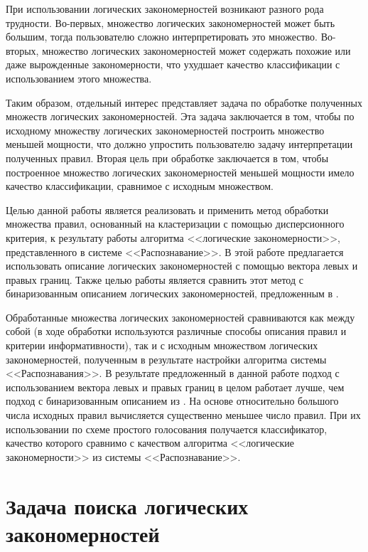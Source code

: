 \documentclass[12pt]{article}
\begin{document}
При использовании логических закономерностей возникают разного рода
трудности. Во-первых, множество логических закономерностей может быть
большим, тогда пользователю сложно интерпретировать это
множество. Во-вторых, множество логических закономерностей может
содержать похожие или даже вырожденные закономерности, что ухудшает
качество классификации с использованием этого множества.

Таким образом, отдельный интерес представляет задача по обработке
полученных множеств логических закономерностей. Эта задача заключается
в том, чтобы по исходному множеству логических закономерностей
построить множество меньшей мощности, что должно упростить
пользователю задачу интерпретации полученных правил. Вторая цель при
обработке заключается в том, чтобы построенное множество логических
закономерностей меньшей мощности имело качество классификации,
сравнимое с исходным множеством.

Целью данной работы является реализовать и применить метод обработки
множества правил, основанный на кластеризации с помощью дисперсионного
критерия, к результату работы алгоритма <<логические закономерности>>,
представленного в системе <<Распознавание>>. В этой работе
предлагается использовать описание логических закономерностей с
помощью вектора левых и правых границ. Также целью работы является
сравнить этот метод с бинаризованным описанием логических
закономерностей, предложенным в \cite{novikov15}.

Обработанные множества логических закономерностей сравниваются как
между собой (в ходе обработки используются различные способы описания
правил и критерии информативности), так и с исходным множеством
логических закономерностей, полученным в результате настройки
алгоритма системы <<Распознавания>>. В результате предложенный в
данной работе подход с использованием вектора левых и правых границ в
целом работает лучше, чем подход с бинаризованным описанием из
\cite{novikov15}. На основе относительно большого числа исходных
правил вычисляется существенно меньшее число правил. При их
использовании по схеме простого голосования получается классификатор,
качество которого сравнимо с качеством алгоритма <<логические
закономерности>> из системы <<Распознавание>>.

\section{Задача поиска логических закономерностей}
\end{document}
